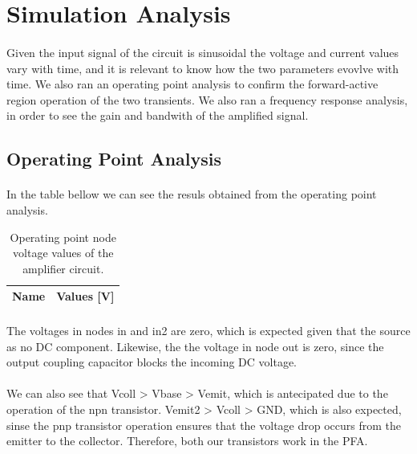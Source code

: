 \section{Simulation Analysis}
\label{sec:simulation}

\paragraph{} Given the input signal of the circuit is sinusoidal the voltage and current values vary with time, and it is relevant to know how the two parameters evovlve with time. 
We also ran an operating point analysis to confirm the forward-active region operation of the two transients. We also ran a frequency response analysis, in order to see the gain and
 bandwith of the amplified signal.

\subsection{Operating Point Analysis}

\paragraph{} In the table bellow we can see the resuls obtained from the operating point analysis.

\begin{table}[h]
  \centering
  \begin{tabular}{|l|r|}
    \hline    
    {\bf Name} & {\bf Values [V]} \\ \hline
     
  \end{tabular}
  \caption{Operating point node voltage values of the amplifier circuit.}
  \label{tab:operator}
\end{table}

\paragraph{} The voltages in nodes in and in2 are zero, which is expected given that the source as no DC component. Likewise, the the voltage in node out is zero, since the output 
coupling capacitor blocks the incoming DC voltage.

\paragraph{} We can also see that Vcoll > Vbase > Vemit, which is antecipated due to the operation of the npn transistor. Vemit2 > Vcoll > GND, which is also expected, sinse the pnp 
transistor operation ensures that the voltage drop occurs from the emitter to the collector. Therefore, both our transistors work in the PFA.

